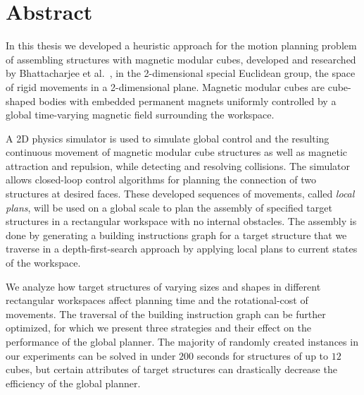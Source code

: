 \chapter*{Abstract}

In this thesis we developed a heuristic approach for the motion planning problem of assembling structures with magnetic modular cubes, developed and researched by Bhattacharjee et al.\ \cite{Bhattacharjee2022}, in the 2-dimensional special Euclidean group, the space of rigid movements in a 2-dimensional plane.
Magnetic modular cubes are cube-shaped bodies with embedded permanent magnets uniformly controlled by a global time-varying magnetic field surrounding the workspace.

A 2D physics simulator is used to simulate global control and the resulting continuous movement of magnetic modular cube structures as well as magnetic attraction and repulsion, while detecting and resolving collisions.
The simulator allows closed-loop control algorithms for planning the connection of two structures at desired faces.
These developed sequences of movements, called \textit{local plans}, will be used on a global scale to plan the assembly of specified target structures in a rectangular workspace with no internal obstacles.
The assembly is done by generating a building instructions graph for a target structure that we traverse in a depth-first-search approach by applying local plans to current states of the workspace.

We analyze how target structures of varying sizes and shapes in different rectangular workspaces affect planning time and the rotational-cost of movements.
The traversal of the building instruction graph can be further optimized, for which we present three strategies and their effect on the performance of the global planner.
The majority of randomly created instances in our experiments can be solved in under $200$ seconds for structures of up to $12$ cubes, but certain attributes of target structures can drastically decrease the efficiency of the global planner.